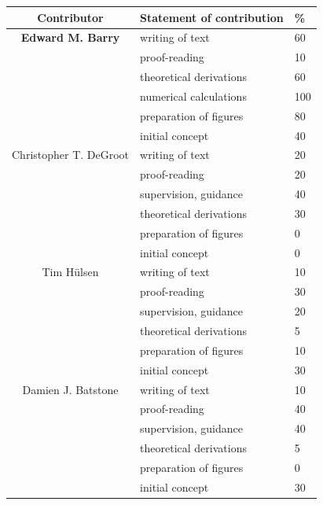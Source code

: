 \cleartoevenpage
\pagestyle{empty}	%

\noindent


\begin{table}[h]
	\begin{center}
	\begin{tabular}{|c|l|l|}
		\hline
		Contributor & Statement of contribution & \% \\
		\hline
		\textbf{Edward M. Barry}	    & writing of text 			& 60\\
										& proof-reading				& 10 \\
										& theoretical derivations 	& 60 \\
										& numerical calculations 	& 100 \\
										& preparation of figures 	& 80 \\
										& initial concept			& 40 \\
		\hline
		Christopher T. DeGroot			& writing of text 			& 20\\
										& proof-reading				& 20 \\
										& supervision, guidance 	& 40\\
										& theoretical derivations 	& 30\\
										& preparation of figures 	& 0 \\
										& initial concept			& 0 \\
		\hline
		Tim H\"{u}lsen		    		& writing of text 			& 10\\
										& proof-reading				& 30 \\
										& supervision, guidance 	& 20 \\
										& theoretical derivations 	& 5 \\
										& preparation of figures 	& 10 \\
										& initial concept			& 30 \\
		\hline
		Damien J. Batstone	    		& writing of text 			& 10\\
										& proof-reading				& 40 \\
										& supervision, guidance 	& 40 \\
										& theoretical derivations 	& 5 \\
										& preparation of figures 	&  0\\
										& initial concept			& 30 \\
		\hline
	\end{tabular}
	\end{center}
\end{table}

